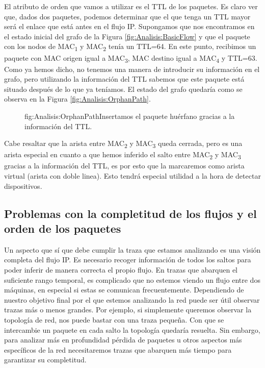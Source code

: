 \documentclass[tfg,epsbased,lof,lot,loa,final,nocopyright,overleaf]{tfgtfmthesisuam}
\begin{document}
El atributo de orden que vamos a utilizar es el TTL de los paquetes. Es claro ver que, dados dos paquetes, podemos determinar que el que tenga un TTL mayor será el enlace que está antes en el flujo IP. Supongamos que nos encontramos en el estado inicial del grafo de la Figura \ref{fig:Analisis:BasicFlow} y que el paquete con los nodos de MAC\textsubscript{1} y MAC\textsubscript{2} tenía un TTL=64. En este punto, recibimos un paquete con MAC origen igual a MAC\textsubscript{3}, MAC destino igual a MAC\textsubscript{4} y TTL=63. Como ya hemos dicho, no tenemos una manera de introducir su información en el grafo, pero utilizando la información del TTL sabemos que este paquete está situado después de lo que ya teníamos. El estado del grafo quedaría como se observa en la Figura \ref{fig:Analisis:OrphanPath}.

\begin{figure}[Ejemplo de resolución de camino huérfano]{fig:Analisis:OrphanPath}{Insertamos el paquete huérfano gracias a la información del TTL.}
    
\end{figure}

Cabe resaltar que la  arista entre MAC\textsubscript{2} y MAC\textsubscript{3} queda cerrada, pero es una arista especial en cuanto a que hemos inferido el salto entre MAC\textsubscript{2} y MAC\textsubscript{3} gracias a la información del TTL, es por esto que la marcaremos como arista virtual (arista con doble linea). Esto tendrá especial utilidad a la hora de detectar dispositivos.

\subsection{Problemas con la completitud de los flujos y el orden de los paquetes}
Un aspecto que sí que debe cumplir la traza que estamos analizando es una visión completa del flujo IP. Es necesario recoger información de todos los saltos para poder inferir de manera correcta el propio flujo. En trazas que abarquen el suficiente rango temporal, es complicado que no estemos viendo un flujo entre dos máquinas, en especial si estas se comunican frecuentemente. Dependiendo de nuestro objetivo final por el que estemos analizando la red puede ser útil observar trazas más o menos grandes. Por ejemplo, si simplemente queremos observar la topología de red, nos puede bastar con una traza pequeña. Con que se intercambie un paquete en cada salto la topología quedaría resuelta. Sin embargo, para analizar más en profundidad pérdida de paquetes u otros aspectos más específicos de la red necesitaremos trazas que abarquen más tiempo para garantizar su completitud.
\end{document}
